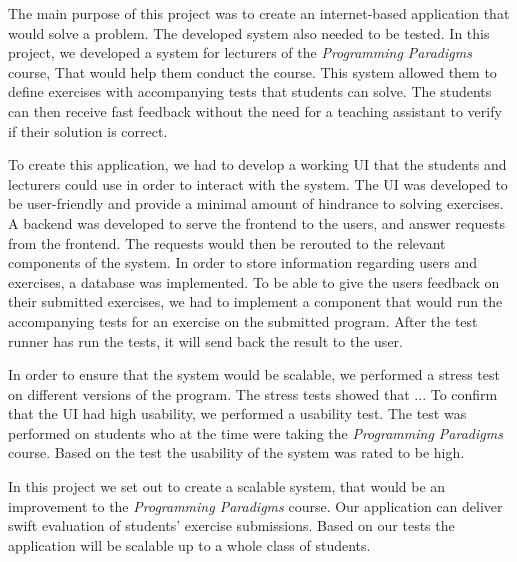 The main purpose of this project was to create an internet-based application that would solve a problem. The developed system also needed to be tested. 
In this project, we developed a system for lecturers of the \textit{Programming Paradigms} course, That would help them conduct the course. This system allowed them to define exercises with accompanying tests that students can solve. 
The students can then receive fast feedback without the need for a teaching assistant to verify if their solution is correct. 

To create this application, we had to develop a working UI that the students and lecturers could use in order to interact with the system. The UI was developed to be user-friendly and provide a minimal amount of hindrance to solving exercises.
A backend was developed to serve the frontend to the users, and answer requests from the frontend. 
The requests would then be rerouted to the relevant components of the system. 
In order to store information regarding users and exercises, a database was implemented.
To be able to give the users feedback on their submitted exercises, we had to implement a component that would run the accompanying tests for an exercise on the submitted program. 
After the test runner has run the tests, it will send back the result to the user.

In order to ensure that the system would be scalable, we performed a stress test on different versions of the program. 
The stress tests showed that ... 
To confirm that the UI had high usability, we performed a usability test.
The test was performed on students who at the time were taking the \textit{Programming Paradigms} course.
Based on the test the usability of the system was rated to be high.  

In this project we set out to create a scalable system, that would be an improvement to the \textit{Programming Paradigms} course.
Our application can deliver swift evaluation of students' exercise submissions. Based on our tests the application will be scalable up to a whole class of students.

